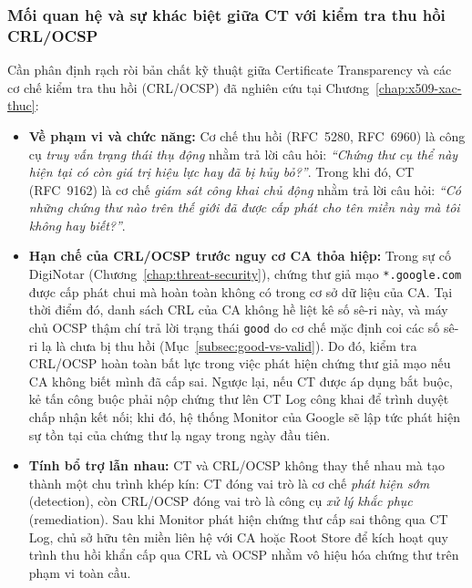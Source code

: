 \subsubsection{Mối quan hệ và sự khác biệt giữa CT với kiểm tra thu hồi CRL/OCSP}
Cần phân định rạch ròi bản chất kỹ thuật giữa Certificate Transparency và các cơ chế kiểm tra thu hồi (CRL/OCSP) đã nghiên cứu tại Chương~\ref{chap:x509-xac-thuc}:
\begin{itemize}
    \item \textbf{Về phạm vi và chức năng:} Cơ chế thu hồi (RFC~5280, RFC~6960) là công cụ \textit{truy vấn trạng thái thụ động} nhằm trả lời câu hỏi: \textit{``Chứng thư cụ thể này hiện tại có còn giá trị hiệu lực hay đã bị hủy bỏ?''}. Trong khi đó, CT (RFC~9162) là cơ chế \textit{giám sát công khai chủ động} nhằm trả lời câu hỏi: \textit{``Có những chứng thư nào trên thế giới đã được cấp phát cho tên miền này mà tôi không hay biết?''}.
    \item \textbf{Hạn chế của CRL/OCSP trước nguy cơ CA thỏa hiệp:} Trong sự cố DigiNotar (Chương~\ref{chap:threat-security}), chứng thư giả mạo \texttt{*.google.com} được cấp phát chui mà hoàn toàn không có trong cơ sở dữ liệu của CA. Tại thời điểm đó, danh sách CRL của CA không hề liệt kê số sê-ri này, và máy chủ OCSP thậm chí trả lời trạng thái \texttt{good} do cơ chế mặc định coi các số sê-ri lạ là chưa bị thu hồi (Mục~\ref{subsec:good-vs-valid}). Do đó, kiểm tra CRL/OCSP hoàn toàn bất lực trong việc phát hiện chứng thư giả mạo nếu CA không biết mình đã cấp sai. Ngược lại, nếu CT được áp dụng bắt buộc, kẻ tấn công buộc phải nộp chứng thư lên CT Log công khai để trình duyệt chấp nhận kết nối; khi đó, hệ thống Monitor của Google sẽ lập tức phát hiện sự tồn tại của chứng thư lạ ngay trong ngày đầu tiên.
    \item \textbf{Tính bổ trợ lẫn nhau:} CT và CRL/OCSP không thay thế nhau mà tạo thành một chu trình khép kín: CT đóng vai trò là cơ chế \textit{phát hiện sớm} (detection), còn CRL/OCSP đóng vai trò là công cụ \textit{xử lý khắc phục} (remediation). Sau khi Monitor phát hiện chứng thư cấp sai thông qua CT Log, chủ sở hữu tên miền liên hệ với CA hoặc Root Store để kích hoạt quy trình thu hồi khẩn cấp qua CRL và OCSP nhằm vô hiệu hóa chứng thư trên phạm vi toàn cầu.
\end{itemize}

